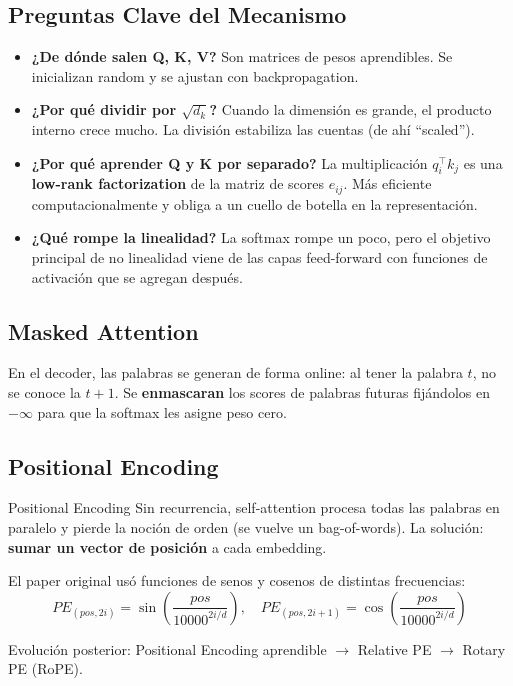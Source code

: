 \documentclass[12pt, a4paper]{article}
\begin{document}
\subsection{Preguntas Clave del Mecanismo}

\begin{itemize}
	\item \textbf{¿De dónde salen Q, K, V?} Son matrices de pesos aprendibles. Se inicializan random y se ajustan con backpropagation.
	\item \textbf{¿Por qué dividir por $\sqrt{d_k}$?} Cuando la dimensión es grande, el producto interno crece mucho. La división estabiliza las cuentas (de ahí ``scaled'').
	\item \textbf{¿Por qué aprender Q y K por separado?} La multiplicación $q_i^\top k_j$ es una \textbf{low-rank factorization} de la matriz de scores $e_{ij}$. Más eficiente computacionalmente y obliga a un cuello de botella en la representación.
	\item \textbf{¿Qué rompe la linealidad?} La softmax rompe un poco, pero el objetivo principal de no linealidad viene de las capas feed-forward con funciones de activación que se agregan después.
\end{itemize}

\subsection{Masked Attention}

En el decoder, las palabras se generan de forma online: al tener la palabra $t$, no se conoce la $t+1$. Se \textbf{enmascaran} los scores de palabras futuras fijándolos en $-\infty$ para que la softmax les asigne peso cero.

\subsection{Positional Encoding}

\begin{defbox}{Positional Encoding}
	Sin recurrencia, self-attention procesa todas las palabras en paralelo y pierde la noción de orden (se vuelve un bag-of-words). La solución: \textbf{sumar un vector de posición} a cada embedding.

	El paper original usó funciones de senos y cosenos de distintas frecuencias:
	\[
		PE_{(pos, 2i)} = \sin\!\left(\frac{pos}{10000^{2i/d}}\right), \quad
		PE_{(pos, 2i+1)} = \cos\!\left(\frac{pos}{10000^{2i/d}}\right)
	\]

	Evolución posterior: Positional Encoding aprendible $\rightarrow$ Relative PE $\rightarrow$ Rotary PE (RoPE).
\end{defbox}
\end{document}
